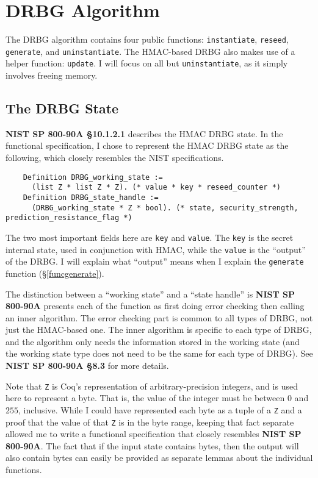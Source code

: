 \documentclass[pageno]{jpaper}
\newcommand{\stdtitle}[1]{\textbf{#1}}
\begin{document}
\section{DRBG Algorithm}
The DRBG algorithm contains four public functions: \lstinline{instantiate}, \lstinline{reseed}, \lstinline{generate}, and \lstinline{uninstantiate}. The HMAC-based DRBG also makes use of a helper function: \lstinline{update}. I will focus on all but \lstinline{uninstantiate}, as it simply involves freeing memory.

\subsection{The DRBG State} \label{funcstate}

\stdtitle{NIST SP 800-90A \S 10.1.2.1} describes the HMAC DRBG state. In the functional specification, I chose to represent the HMAC DRBG state as the following, which closely resembles the NIST specifications.

\begin{lstlisting}
    Definition DRBG_working_state :=
      (list Z * list Z * Z). (* value * key * reseed_counter *)
    Definition DRBG_state_handle :=
      (DRBG_working_state * Z * bool). (* state, security_strength, prediction_resistance_flag *)
\end{lstlisting}

The two most important fields here are \lstinline{key} and \lstinline{value}. The \lstinline{key} is the secret internal state, used in conjunction with HMAC, while the \lstinline{value} is the “output” of the DRBG. I will explain what “output” means when I explain the \lstinline{generate} function (\S \ref{funcgenerate}).

The distinction between a “working state” and a “state handle” is \stdtitle{NIST SP 800-90A} presents each of the function as first doing error checking then calling an inner algorithm. The error checking part is common to all types of DRBG, not just the HMAC-based one. The inner algorithm is specific to each type of DRBG, and the algorithm only needs the information stored in the working state (and the working state type does not need to be the same for each type of DRBG). See \stdtitle{NIST SP 800-90A \S 8.3} for more details.

Note that \lstinline{Z} is Coq’s representation of arbitrary-precision integers, and is used here to represent a byte. That is, the value of the integer must be between $0$ and $255$, inclusive. While I could have represented each byte as a tuple of a \lstinline{Z} and a proof that the value of that \lstinline{Z} is in the byte range, keeping that fact separate allowed me to write a functional specification that closely resembles \stdtitle{NIST SP 800-90A}. The fact that if the input state contains bytes, then the output will also contain bytes can easily be provided as separate lemmas about the individual functions.
\end{document}
